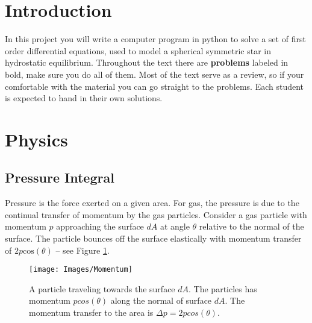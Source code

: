\documentclass{article}
\begin{document}
\section{Introduction}
In this project you will write a computer program in python to solve a set of first order differential equations, used to model a spherical symmetric star in hydrostatic equilibrium. Throughout the text there are \textbf{problems} labeled in bold, make sure you do all of them. Most of the text serve as  a review, so if your comfortable with the material you can go straight to the problems. Each student is expected to hand in their own solutions.

\section{Physics}

\subsection{Pressure Integral}
Pressure is the force exerted on a given area. For gas, the pressure is due to the continual transfer of momentum by the gas particles. Consider a gas particle with momentum $p$ approaching the surface $dA$ at angle $\theta$ relative to the normal of the surface. The particle bounces off the surface elastically with momentum transfer of $2 p\mathrm{cos}\left(\theta\right)$ -- see Figure \ref{Fig: Momentum}.

\begin{figure}[h!]
\begin{center}
\texttt{[image: Images/Momentum]}
\end{center}
\caption{A particle traveling towards the surface $dA$. The particles has momentum $pcos\left(\theta\right)$ along the normal of
surface $dA$. The momentum transfer to the area is $\Delta p = 2pcos\left(\theta\right)$.}
\label{Fig: Momentum}
\end{figure}
\end{document}

